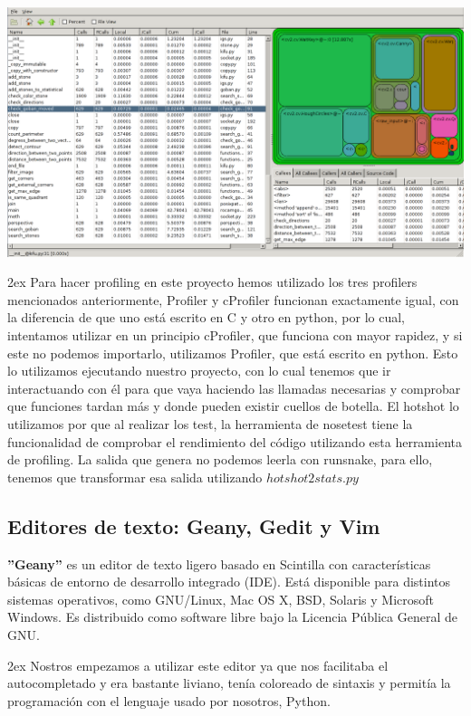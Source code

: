 \documentclass[12pt,a4paper]{report}
\begin{document}
\includegraphics[scale=0.33]{runsnake.png}

\parskip 2ex
Para hacer profiling en este proyecto hemos utilizado los tres profilers
mencionados anteriormente, Profiler y cProfiler funcionan exactamente igual, con
la diferencia de que uno está escrito en C y otro en python, por lo cual,
intentamos utilizar en un principio cProfiler, que funciona con mayor rapidez, y
si este no podemos importarlo, utilizamos Profiler, que está escrito en
python. Esto lo utilizamos ejecutando nuestro proyecto, con lo cual tenemos que
ir interactuando con él para que vaya haciendo las llamadas necesarias y
comprobar que funciones tardan más y donde pueden existir cuellos de botella. 
El hotshot lo utilizamos por que al realizar los test, la herramienta de
nosetest tiene la funcionalidad de comprobar el rendimiento del código
utilizando esta herramienta de profiling. La salida que genera no podemos leerla
con runsnake, para ello, tenemos que transformar esa salida utilizando
$hotshot2stats.py$


\subsection{Editores de texto: Geany, Gedit y Vim}

\textbf{''Geany''} es un editor de texto ligero basado en Scintilla con características
básicas de entorno de desarrollo integrado (IDE). Está disponible para distintos
sistemas operativos, como GNU/Linux, Mac OS X, BSD, Solaris y Microsoft Windows.
Es distribuido como software libre bajo la Licencia Pública General de GNU.

\parskip 2ex
Nostros empezamos a utilizar este editor ya que nos facilitaba el autocompletado
y era bastante liviano, tenía coloreado de sintaxis y permitía la programación
con el lenguaje usado por nosotros, Python. 
\end{document}
